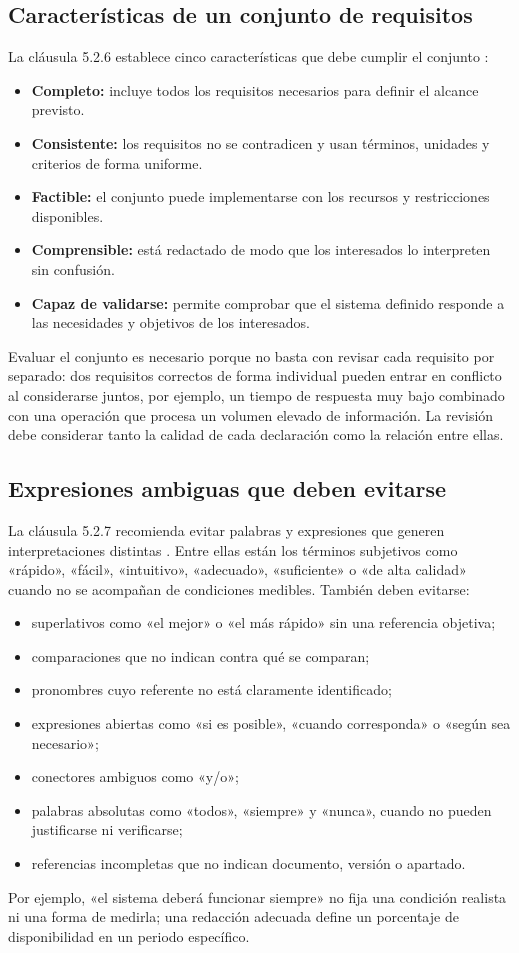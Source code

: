 \documentclass[10pt,a4paper]{article}
\begin{document}
\subsection{Características de un conjunto de requisitos}
La cláusula 5.2.6 establece cinco características que debe cumplir el conjunto \cite[cl.~5.2.6]{iso29148}:
\begin{itemize}
  \item \textbf{Completo:} incluye todos los requisitos necesarios para definir el alcance previsto.
  \item \textbf{Consistente:} los requisitos no se contradicen y usan términos, unidades y criterios de forma uniforme.
  \item \textbf{Factible:} el conjunto puede implementarse con los recursos y restricciones disponibles.
  \item \textbf{Comprensible:} está redactado de modo que los interesados lo interpreten sin confusión.
  \item \textbf{Capaz de validarse:} permite comprobar que el sistema definido responde a las necesidades y objetivos de los interesados.
\end{itemize}
Evaluar el conjunto es necesario porque no basta con revisar cada requisito por separado: dos requisitos correctos de forma individual pueden entrar en conflicto al considerarse juntos, por ejemplo, un tiempo de respuesta muy bajo combinado con una operación que procesa un volumen elevado de información. La revisión debe considerar tanto la calidad de cada declaración como la relación entre ellas.

\subsection{Expresiones ambiguas que deben evitarse}
La cláusula 5.2.7 recomienda evitar palabras y expresiones que generen interpretaciones distintas \cite[cl.~5.2.7]{iso29148}. Entre ellas están los términos subjetivos como «rápido», «fácil», «intuitivo», «adecuado», «suficiente» o «de alta calidad» cuando no se acompañan de condiciones medibles. También deben evitarse:
\begin{itemize}
  \item superlativos como «el mejor» o «el más rápido» sin una referencia objetiva;
  \item comparaciones que no indican contra qué se comparan;
  \item pronombres cuyo referente no está claramente identificado;
  \item expresiones abiertas como «si es posible», «cuando corresponda» o «según sea necesario»;
  \item conectores ambiguos como «y/o»;
  \item palabras absolutas como «todos», «siempre» y «nunca», cuando no pueden justificarse ni verificarse;
  \item referencias incompletas que no indican documento, versión o apartado.
\end{itemize}
Por ejemplo, «el sistema deberá funcionar siempre» no fija una condición realista ni una forma de medirla; una redacción adecuada define un porcentaje de disponibilidad en un periodo específico.
\end{document}
